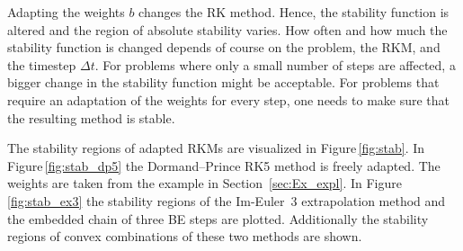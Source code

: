 \documentclass[a4paper]{article}
\numberwithin{equation}{section}
\theoremstyle{plain}
\theoremstyle{definition}
\numberwithin{theorem}{section}
\newcommand{\dt}{{\Delta t}}
\newcommand{\1}{\mathbbm{1}}
\begin{document}
Adapting the weights $b$ changes the RK method. Hence, the stability
function is altered and the region of absolute stability varies.
How often and how much the stability function is changed depends
of course on the problem, the RKM, and the timestep $\dt$.
For problems where only a small number of steps are affected, a bigger
change in the stability function might be acceptable. For problems
that require an adaptation of the weights for every step, one needs
to make sure that the resulting method is stable.

The stability regions of adapted RKMs are visualized in
Figure\,\ref{fig:stab}.
In Figure\,\ref{fig:stab_dp5} the Dormand--Prince RK5 method is freely adapted.
The weights are taken from the example in Section~\ref{sec:Ex_expl}.
In Figure\,\ref{fig:stab_ex3} the stability regions of the Im-Euler~3
extrapolation method and the embedded chain of three BE steps are
plotted. Additionally the stability regions of convex combinations
of these two methods are shown.
\end{document}
